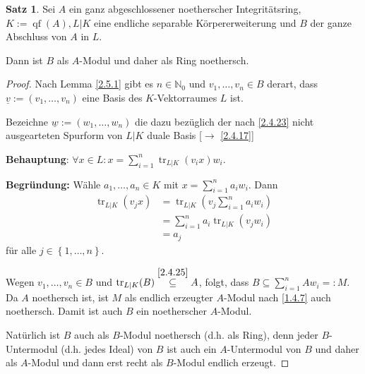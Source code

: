 \documentclass[
twoside=semi,
fontsize=12,
DIV=12, 
cleardoublepage=current,
leqno,
headings=optiontoheadandtoc, 
toc=idx
]{scrbook}
\newcommand{\N}{\mathbb{N}}
\newcommand{\brac}[1]{\left( #1 \right)}
\newcommand{\set}[1]{\left\{ #1 \right\}}
\DeclareMathOperator{\qf}{qf}
\DeclareMathOperator{\tr}{tr}
\theoremstyle{definition}
\newtheorem{satz}[definition]{Satz}
\begin{document}
 	\begin{satz}\label{2.5.2}\hfill\newline
 		Sei $A$ ein ganz abgeschlossener noetherscher Integrit\"atsring, $K:= \qf(A), L|K$ eine endliche separable K\"orpererweiterung und $B$ der ganze Abschluss von $A$ in $L$.
 		
 		\medskip\noindent 
 		Dann ist $B$ als $A$-Modul und daher als Ring noethersch.
 		
 		\begin{proof}
 			Nach Lemma \ref{2.5.1} gibt es $n \in \N_0$ und $v_1, \dots, v_n \in B$ derart, dass \linebreak $\underline{v} := (v_1, \dots, v_n)$ eine Basis des $K$-Vektorraumes $L$ ist.
 			
 			Bezeichne $\underline{w} := (w_1, \dots, w_n)$ die dazu bez\"uglich der nach \ref{2.4.23} nicht ausgearteten Spurform von $L|K$ duale Basis [$\to$ \ref{2.4.17}]
 			
 			\begin{tcolorbox}[colback=white,colframe=blue,arc=0cm]
	 			\textbf{Behauptung}: $\forall x \in L: x = \sum_{i=1}^{n} \tr_{L|K}(v_ix)w_i$.
	 			
	 			\tcblower
	 			\textbf{Begr\"undung: } W\"ahle $a_1, \dots, a_n \in K$ mit $x = \sum_{i=1}^{n} a_iw_i$. Dann 
	 			\begin{align*}
	 				\tr_{L|K}(v_jx) &= \tr_{L|K}\brac{v_j\sum_{i=1}^{n}a_iw_i}\\
	 				&= \sum_{i=1}^{n} a_i\tr_{L|K}(v_jw_i)\\
	 				&= a_j
	 			\end{align*}
	 			f\"ur alle $j \in \set{1,\dots, n}$.
 			\end{tcolorbox}
 			
 			\noindent
 			Wegen $v_1, \dots, v_n \in B$ und $\tr_{L|K}(B) \overset{\ref{2.4.25}}{\subseteq} A$, folgt, dass $B \subseteq \sum_{i=1}^{n} Aw_i =: M$. Da $A$ noethersch ist,
 			ist $M$ als endlich erzeugter $A$-Modul nach \ref{1.4.7} auch noethersch. Damit ist auch $B$ ein noetherscher $A$-Modul.
 			
 			Nat\"urlich ist $B$ auch als $B$-Modul noethersch (d.h. als Ring), denn jeder $B$-Untermodul (d.h. jedes Ideal) von $B$ ist auch ein $A$-Untermodul von $B$ und daher als $A$-Modul 
 			und dann erst recht als $B$-Modul endlich erzeugt.
 		\end{proof}
 	\end{satz}
 
\end{document}
